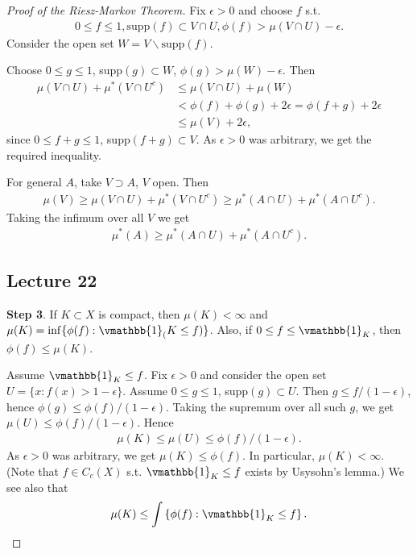 \begin{proof}[Proof of the Riesz-Markov Theorem]
    Fix \(\epsilon>0\) and choose \(f\) s.t.
    \begin{align*}
        0\leq f\leq 1, \text{supp}(f)\subset V\cap U, \phi(f)>\mu\left(V\cap U\right) - \epsilon.
    \end{align*}
    Consider the open set \(W=V\backslash\text{supp}(f)\).

    Choose \(0\leq g\leq 1\), supp\((g)\subset W\), \(\phi(g)>\mu(W)-\epsilon\). Then
    \begin{align*}
        \mu\left(V\cap U\right) + \mu^*\left(V\cap U^c\right) &\leq \mu\left(V\cap U\right) + \mu(W) \\
        &< \phi(f) + \phi(g) + 2\epsilon = \phi(f+g) + 2\epsilon \\
        &\leq \mu(V) + 2\epsilon,
    \end{align*}
    since \(0\leq f+g\leq 1\), supp\((f+g)\subset V\). As \(\epsilon>0\) was arbitrary, we get the required inequality. 

    For general \(A\), take \(V\supset A\), \(V\) open. Then 
    \begin{align*}
        \mu(V) \geq \mu\left(V\cap U\right) + \mu^*\left(V\cap U^c\right) \geq \mu^*\left(A\cap U\right) + \mu^*\left(A\cap U^c\right).
    \end{align*}
    Taking the infimum over all \(V\) we get
    \begin{align*}
        \mu^*(A) \geq \mu^*\left(A\cap U\right) + \mu^*\left(A\cap U^c\right).
    \end{align*}
    
    \subsection*{Lecture 22}
    \setcounter{section}{22}
    \setcounter{theorem}{22}

    \textbf{Step 3}. If \(K\subset X\) is compact, then \(\mu(K)<\infty\) and \(\mu(K)=\inf\{\phi(f):\vmathbb{1}_(K\leq f)\}\). Also, if \(0\leq f\leq \vmathbb{1}_K\), then \(\phi(f)\leq\mu(K)\).

    Assume \(\vmathbb{1}_K\leq f\). Fix \(\epsilon>0\) and consider the open set \(U=\{x:f(x)>1-\epsilon\}\). Assume \(0\leq g\leq 1\), supp\((g)\subset U\). Then \(g\leq f/(1-\epsilon)\), hence \(\phi(g)\leq \phi(f)/(1-\epsilon)\). Taking the supremum over all such \(g\), we get \(\mu(U)\leq \phi(f)/(1-\epsilon)\). Hence
    \begin{align*}
        \mu(K) \leq\mu(U)\leq\phi(f)/(1-\epsilon).
    \end{align*}
    As \(\epsilon>0\) was arbitrary, we get \(\mu(K)\leq\phi(f)\). In particular, \(\mu(K)<\infty\). (Note that \(f\in C_c(X)\) s.t. \(\vmathbb{1}_K\leq f\) exists by Usysohn's lemma.) We see also that 
    \begin{align*}
        \mu(K)\leq \int\left\{\phi(f):\vmathbb{1}_K\leq f\right\}.
    \end{align*}


\end{proof}
